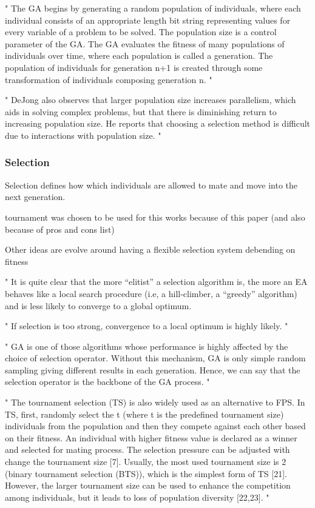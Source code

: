 "
The GA begins by generating a random population of individuals, where each individual consists of an appropriate length bit string representing values for every variable of a problem to be solved. The population size is a control parameter of the GA. The GA evaluates the fitness of many populations of individuals over time, where each population is called a generation. The population of individuals for generation n+1 is created through some transformation of individuals composing generation n.
"\cite{mills_determining_2015}

"
DeJong also observes that larger population size increases parallelism, which aids in solving complex problems, but that there is diminishing return to increasing population size. He reports that choosing a selection method is difficult due to interactions with population size.
"\cite{mills_determining_2015}



\subsubsection{Selection}
Selection defines how which individuals are allowed to mate and move into the next generation.

tournament was chosen to be used for this works because of this paper (and also because of pros and cons list)

Other ideas are evolve around having a flexible selection system debending on fitness 

"
It is quite clear that the more “elitist” a selection algorithm is, the more an EA behaves like a local search procedure (i.e, a hill-climber, a “greedy” algorithm) and is less likely to converge to a global optimum.

"
If selection is too strong, convergence to a local optimum is highly likely.
"\cite{kacprzyk_parameter_2007}


"
GA is one of those algorithms whose performance is highly affected by the choice of selection operator. Without this mechanism, GA is only simple random sampling giving different results in each generation. Hence, we can say that the selection operator is the backbone of the GA process.
" \cite{hussain_trade-off_2020}

"
The tournament selection (TS) is also widely used as an alternative to FPS. In TS, first, randomly select the t (where t is the predefined tournament size) individuals from the population and then they compete against each other based on their fitness. An individual with higher fitness value is declared as a winner and selected for mating process. The selection pressure can be adjusted with change the tournament size [7]. Usually, the most used tournament size is 2 (binary tournament selection (BTS)), which is the simplest form of TS [21]. However, the larger tournament size can be used to enhance the competition among individuals, but it leads to loss of population diversity [22,23].
"\cite{hussain_trade-off_2020}

